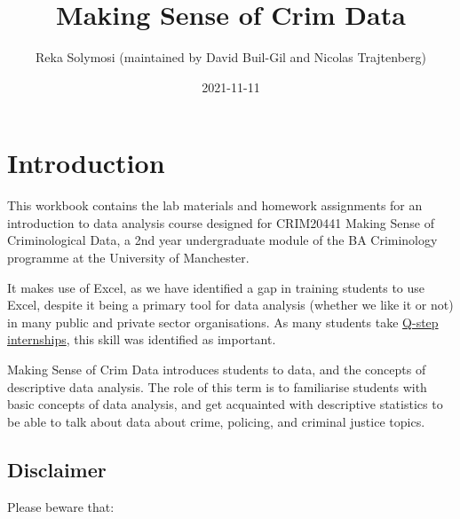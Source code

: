 \documentclass[
]{book}
\title{Making Sense of Crim Data}
\author{Reka Solymosi (maintained by David Buil-Gil and Nicolas Trajtenberg)}
\date{2021-11-11}
\begin{document}
\maketitle

{
\setcounter{tocdepth}{1}
\tableofcontents
}
\hypertarget{introduction}{%
\chapter*{Introduction}\label{introduction}}

This workbook contains the lab materials and homework assignments for an introduction to data analysis course designed for CRIM20441 Making Sense of Criminological Data, a 2nd year undergraduate module of the BA Criminology programme at the University of Manchester.

It makes use of Excel, as we have identified a gap in training students to use Excel, despite it being a primary tool for data analysis (whether we like it or not) in many public and private sector organisations. As many students take \href{https://www.humanities.manchester.ac.uk/q-step/}{Q-step internships}, this skill was identified as important.

Making Sense of Crim Data introduces students to data, and the concepts of descriptive data analysis. The role of this term is to familiarise students with basic concepts of data analysis, and get acquainted with descriptive statistics to be able to talk about data about crime, policing, and criminal justice topics.

\hypertarget{disclaimer}{%
\section*{Disclaimer}\label{disclaimer}}

Please beware that:
\end{document}
